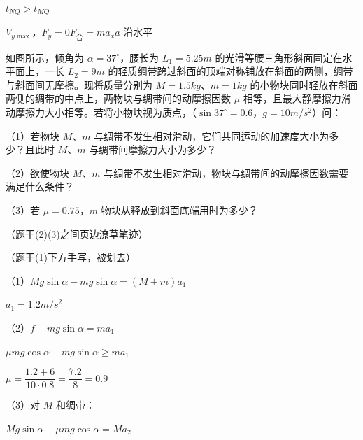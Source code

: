 $t_{NQ}>t_{MQ}$

$V_{y\max}$，$F_y=0$\quad $F_{\text{合}}=ma_x$\quad $a$ 沿水平
\begin{problem}[21.（2+2+4=8）]
如图所示，倾角为 $\alpha=37^\circ$，腰长为 $L_1=5.25\unit{m}$ 的光滑等腰三角形斜面固定在水平面上，一长 $L_2=9\unit{m}$ 的轻质绸带跨过斜面的顶端对称铺放在斜面的两侧，绸带与斜面间无摩擦。现将质量分别为 $M=1.5\unit{kg}$、$m=1\unit{kg}$ 的小物块同时轻放在斜面两侧的绸带的中点上，两物块与绸带间的动摩擦因数 $\mu$ 相等，且最大静摩擦力滑动摩擦力大小相等。若将小物块视为质点，（$\sin37^\circ=0.6$，$g=10\unit{m/s^2}$）问：%

（1）若物块 $M$、$m$ 与绸带不发生相对滑动，它们共同运动的加速度大小为多少？且此时 $M$、$m$ 与绸带间摩擦力大小为多少？

（2）欲使物块 $M$、$m$ 与绸带不发生相对滑动，物块与绸带间的动摩擦因数需要满足什么条件？

（3）若 $\mu=0.75$，$m$ 物块从释放到斜面底端用时为多少？

（题干(2)(3)之间页边潦草笔迹）


\begin{solution}
（题干(1)下方手写，被划去）

（1）$Mg\sin\alpha-mg\sin\alpha=(M+m)a_1$

\hspace{1.6em}$a_1=1.2\unit{m/s^2}$

（2）$f-mg\sin\alpha=ma_1$

\hspace{1.6em}$\mu mg\cos\alpha-mg\sin\alpha\ge ma_1$

\hspace{1.6em}$\mu=\dfrac{1.2+6}{10\cdot0.8}=\dfrac{7.2}{8}=0.9$%

（3）对 $M$ 和绸带：

\hspace{1.6em}$Mg\sin\alpha-\mu mg\cos\alpha=Ma_2$


\end{solution}
\end{problem}
